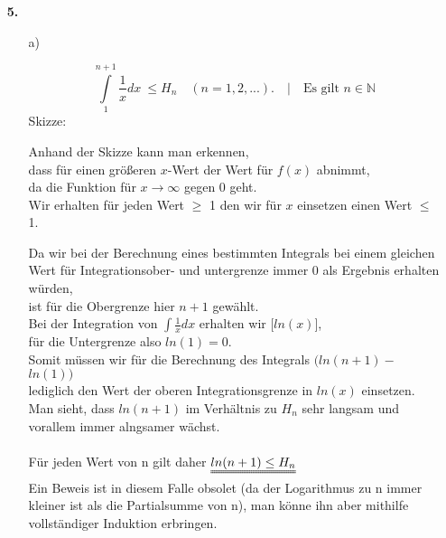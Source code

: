 \documentclass[a4paper,11pt]{article}
\begin{document}
\begin{enumerate}
        \item[\textbf{5.}]
 \begin{enumerate}

                \item[a)]

                    $$ \int\limits_{1}^{n+1}  \frac{1}{x} dx  \ \leq H_n \quad (n=1,2,...). \quad \Big| \quad \text{Es gilt }n \in \mathbb{N}$$
                    Skizze: \\[0.1cm]



                Anhand der Skizze kann man erkennen,\\ dass für einen größeren $x$-Wert der Wert für $f(x)$ abnimmt, \\
                da die Funktion für  $x \rightarrow \infty$ gegen $0$ geht. \\
                Wir erhalten für jeden Wert $\geq$ 1 den wir für $x$ einsetzen einen Wert $\leq$ 1. 

                Da wir bei der Berechnung eines bestimmten Integrals bei einem gleichen Wert für Integrationsober- und untergrenze immer $0$ als Ergebnis erhalten würden, \\ ist für die Obergrenze hier $n+1$ gewählt. \\[0.3cm]
                Bei der Integration von $\int \frac{1}{x}dx$ erhalten wir $\Big[ln(x)\Big]$,\\ für die Untergrenze also $ln(1) = 0$. \\
                Somit müssen wir für die Berechnung des Integrals $ \Big(ln(n+1) -$ \sout{$ ln(1)$}$ \Big)$ \\ lediglich den Wert der oberen Integrationsgrenze in $ln(x)$ einsetzen. \\ 
                Man sieht, dass $ln(n+1)$ im Verhältnis zu $H_n$ sehr langsam und vorallem immer alngsamer wächst.\\ \\
                Für jeden Wert von n gilt daher $\uuline{ln(n+1) \leq H_n}$ \\
                Ein Beweis ist in diesem Falle obsolet (da der Logarithmus zu n immer kleiner ist als die Partialsumme von n), man könne ihn aber mithilfe vollständiger Induktion erbringen.


\end{enumerate}
\end{enumerate}
\end{document}
